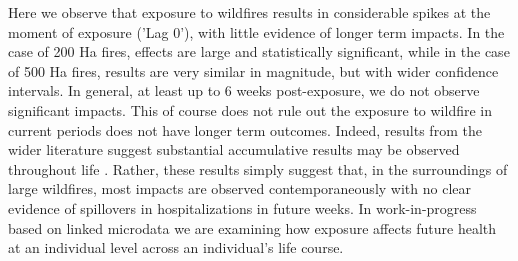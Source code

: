 \documentclass[11pt]{article}
\begin{document}
\begin{spacing}{1.5}
Here we observe that exposure to wildfires results in considerable spikes at the moment of exposure ('Lag 0'), with little evidence of longer term impacts.  In the case of 200 Ha fires, effects are large and statistically significant, while in the case of 500 Ha fires, results are very similar in magnitude, but with wider confidence intervals.  In general, at least up to 6 weeks post-exposure, we do not observe significant impacts.  This of course does not rule out the exposure to wildfire in current periods does not have longer term outcomes.  Indeed, results from the wider literature suggest substantial accumulative results may be observed throughout life \citep{Fulleretal2022,Russetal2021}.  Rather, these results simply suggest that, in the surroundings of large wildfires, most impacts are observed contemporaneously with no clear evidence of spillovers in hospitalizations in future weeks. In work-in-progress based on linked microdata we are examining how exposure affects future health at an individual level across an individual's life course.   



\end{spacing}
\end{document}
